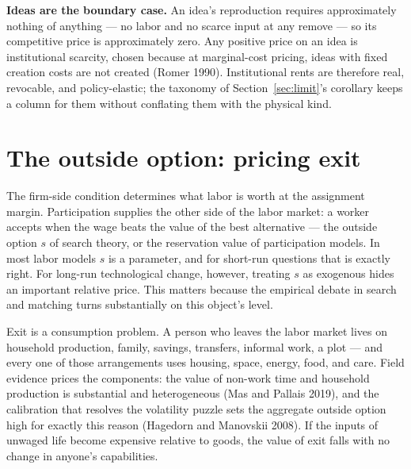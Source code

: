 \documentclass[12pt]{article}
\theoremstyle{plain}
\begin{document}
\textbf{Ideas are the boundary case.} An idea's reproduction requires
approximately nothing of anything --- no labor and no scarce input at any
remove --- so its competitive price is approximately zero. Any positive
price on an idea is institutional scarcity, chosen because at marginal-cost
pricing, ideas with fixed creation costs are not created (Romer 1990).
Institutional rents are therefore real, revocable, and policy-elastic; the
taxonomy of Section~\ref{sec:limit}'s corollary keeps a column for them
without conflating them with the physical kind.

\section{The outside option: pricing exit}\label{sec:floor}

The firm-side condition determines what labor is worth at the assignment margin.
Participation supplies the other side of the labor market: a worker accepts when
the wage beats the value of the best alternative --- the outside option $s$ of
search theory, or the reservation value of participation models. In most labor
models $s$ is a parameter, and for short-run questions that is exactly right.
For long-run technological change, however, treating $s$ as exogenous hides an important relative price. This matters because the empirical debate in search and matching turns substantially on this object's level.

Exit is a consumption problem. A person who leaves the labor market lives on
household production, family, savings, transfers, informal work, a plot --- and
every one of those arrangements uses housing, space, energy, food, and care.
Field evidence prices the components: the value of non-work time and household
production is substantial and heterogeneous (Mas and Pallais 2019), and the
calibration that resolves the volatility puzzle sets the aggregate outside
option high for exactly this reason (Hagedorn and Manovskii 2008). If the inputs
of unwaged life become expensive relative to goods, the value of exit falls with
no change in anyone's capabilities.
\end{document}
